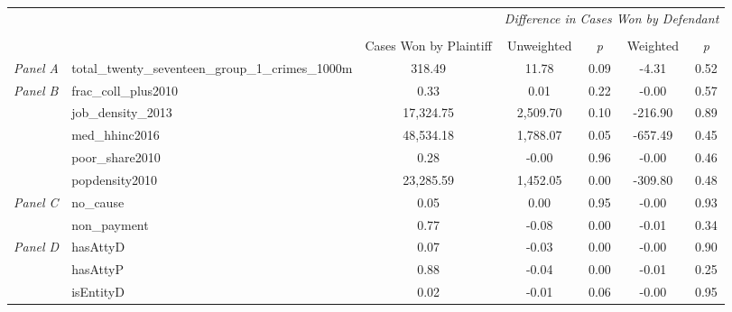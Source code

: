 \begin{tabular}{llccccc}
\toprule
 &  & \textit{} & \multicolumn{4}{c}{\textit{Difference in Cases Won by Defendant}} \\
\cline{4-7}
\\
 &  & Cases Won by Plaintiff & Unweighted & \emph{p} & Weighted & \emph{p} \\
\midrule
\textit{Panel A} & total_twenty_seventeen_group_1_crimes_1000m & 318.49 & 11.78 & 0.09 & -4.31 & 0.52 \\
\cline{1-7}
\multirow[c]{5}{3cm}{\textit{Panel B}} & frac_coll_plus2010 & 0.33 & 0.01 & 0.22 & -0.00 & 0.57 \\
 & job_density_2013 & 17,324.75 & 2,509.70 & 0.10 & -216.90 & 0.89 \\
 & med_hhinc2016 & 48,534.18 & 1,788.07 & 0.05 & -657.49 & 0.45 \\
 & poor_share2010 & 0.28 & -0.00 & 0.96 & -0.00 & 0.46 \\
 & popdensity2010 & 23,285.59 & 1,452.05 & 0.00 & -309.80 & 0.48 \\
\cline{1-7}
\multirow[c]{2}{3cm}{\textit{Panel C}} & no_cause & 0.05 & 0.00 & 0.95 & -0.00 & 0.93 \\
 & non_payment & 0.77 & -0.08 & 0.00 & -0.01 & 0.34 \\
\cline{1-7}
\multirow[c]{3}{3cm}{\textit{Panel D}} & hasAttyD & 0.07 & -0.03 & 0.00 & -0.00 & 0.90 \\
 & hasAttyP & 0.88 & -0.04 & 0.00 & -0.01 & 0.25 \\
 & isEntityD & 0.02 & -0.01 & 0.06 & -0.00 & 0.95 \\
\cline{1-7}
\bottomrule
\end{tabular}
